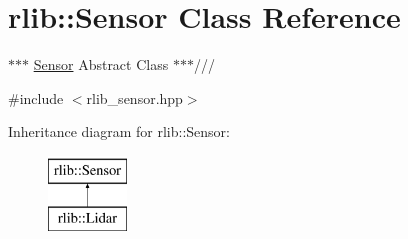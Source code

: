 \hypertarget{classrlib_1_1Sensor}{\section{rlib\-:\-:Sensor Class Reference}
\label{classrlib_1_1Sensor}
}


$\ast$$\ast$$\ast$ \hyperlink{classrlib_1_1Sensor}{Sensor} Abstract Class $\ast$$\ast$$\ast$///  




{\ttfamily \#include $<$rlib\-\_\-sensor.\-hpp$>$}

Inheritance diagram for rlib\-:\-:Sensor\-:\begin{figure}[H]
\begin{center}
\leavevmode
\includegraphics[height=2.000000cm]{classrlib_1_1Sensor}
\end{center}
\end{figure}
